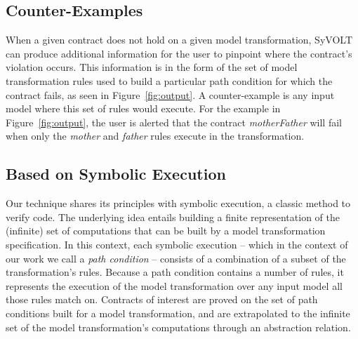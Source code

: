 \subsection{Counter-Examples}

When a given contract does not hold on a given model transformation,
SyVOLT can produce additional information for the user to pinpoint where
the contract's violation occurs. This information is in
the form of the set of model transformation rules used to build a particular
path condition for which the contract fails, as seen in Figure~\ref{fig:output}. A counter-example is any input model where this set of rules would execute. For the example in Figure~\ref{fig:output}, the user is alerted that the contract \textit{motherFather} will fail when only the \textit{mother} and \textit{father} rules execute in the transformation.



\subsection{Based on Symbolic Execution}

Our technique shares its principles with symbolic execution, a classic method to
verify code. The underlying idea entails building a finite representation of the
(infinite) set of computations that can be built by a model transformation
specification. In this context, each symbolic execution -- which in the context
of our work we call a \emph{path condition} -- consists of a combination
of a subset of the transformation's rules.
Because a path condition contains a number of rules, it represents the execution
of the model transformation over any input model all those rules match on.
Contracts of interest are proved on the set of path conditions built for a
model transformation, and are extrapolated to the infinite set of
the model transformation's computations through an abstraction relation.








